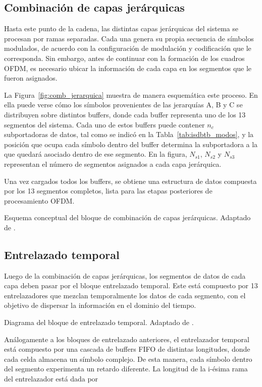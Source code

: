 \subsection{Combinación de capas jerárquicas}

Hasta este punto de la cadena, las distintas capas jerárquicas del sistema se procesan por ramas separadas. Cada una genera su propia secuencia de símbolos modulados, de acuerdo con la configuración de modulación y codificación que le corresponda. Sin embargo, antes de continuar con la formación de los cuadros OFDM, es necesario ubicar la información de cada capa en los segmentos que le fueron asignados.

La Figura~\ref{fig:comb_jerarquica} muestra de manera esquemática este proceso. En ella puede verse cómo los símbolos provenientes de las jerarquías A, B y C se distribuyen sobre distintos buffers, donde cada buffer representa uno de los 13 segmentos del sistema. Cada uno de estos buffers puede contener $n_c$ subportadoras de datos, tal como se indicó en la Tabla~\ref{tab:isdbtb_modos}, y la posición que ocupa cada símbolo dentro del buffer determina la subportadora a la que quedará asociado dentro de ese segmento. En la figura, $N_{s1}$, $N_{s2}$ y $N_{s3}$ representan el número de segmentos asignados a cada capa jerárquica.

Una vez cargados todos los buffers, se obtiene una estructura de datos compuesta por los 13 segmentos completos, lista para las etapas posteriores de procesamiento OFDM.

{Esquema conceptual del bloque de combinación de capas jerárquicas.}
{Adaptado de \cite{abnt}.}
{\label{fig:comb_jerarquica}}


\subsection{Entrelazado temporal}

Luego de la combinación de capas jerárquicas, los segmentos de datos de cada capa deben pasar por el bloque entrelazado temporal. Este está compuesto por 13 entrelazadores que mezclan temporalmente los datos de cada segmento, con el objetivo de dispersar la información en el dominio del tiempo.

{Diagrama del bloque de entrelazado temporal.}
{Adaptado de \cite{abnt}.}
{\label{fig:time_intrl}}

Análogamente a los bloques de entrelazado anteriores, el entrelazador temporal está compuesto por una cascada de buffers FIFO de distintas longitudes, donde cada celda almacena un símbolo complejo. De esta manera, cada símbolo dentro del segmento experimenta un retardo diferente. La longitud de la i-ésima rama del entrelazador está dada por

